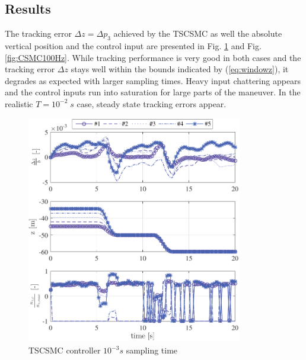 \documentclass{ifacconf}
\begin{document}
\subsection{Results}
The tracking error $\Delta z = \Delta p_3$ achieved by the TSCSMC as well the absolute vertical position and the control input are presented in Fig. \ref{fig:CSMC1000Hz} and Fig. \ref{fig:CSMC100Hz}. While tracking performance is very good in both cases and the tracking error $\Delta z$ stays well within the bounds indicated by (\ref{eq:windowz}), it degrades as expected with larger sampling times. Heavy input chattering appears and the control inputs run into saturation for large parts of the maneuver. In the realistic $T=10^{-2} \; s$ case, steady state tracking errors appear. 
\begin{figure}[h!]
\begin{center}
\includegraphics[width=\columnwidth,height=10cm]{TSCSMC-1000Hz-TIMESCALESEPARATION-turbulence=1}    %
\caption{TSCSMC controller $10^{-3} s$ sampling time}
\label{fig:CSMC1000Hz}
\end{center}
\end{figure}
\end{document}
